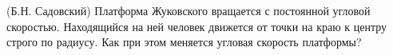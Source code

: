 (Б.Н. Садовский)
Платформа Жуковского вращается с постоянной угловой скоростью.
Находящийся на ней человек движется от точки на краю к центру строго по
радиусу. Как при этом меняется угловая скорость платформы?
